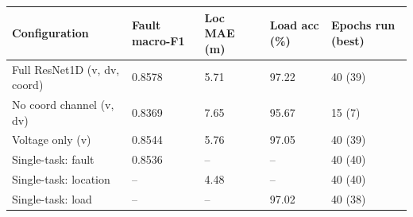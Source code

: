 \begin{tabular}{lllll}
\toprule
Configuration & Fault macro-F1 & Loc MAE (m) & Load acc (\%) & Epochs run (best) \\
\midrule
Full ResNet1D (v, dv, coord) & 0.8578 & 5.71 & 97.22 & 40 (39) \\
No coord channel (v, dv) & 0.8369 & 7.65 & 95.67 & 15 (7) \\
Voltage only (v) & 0.8544 & 5.76 & 97.05 & 40 (39) \\
Single-task: fault & 0.8536 & -- & -- & 40 (40) \\
Single-task: location & -- & 4.48 & -- & 40 (40) \\
Single-task: load & -- & -- & 97.02 & 40 (38) \\
\bottomrule
\end{tabular}
